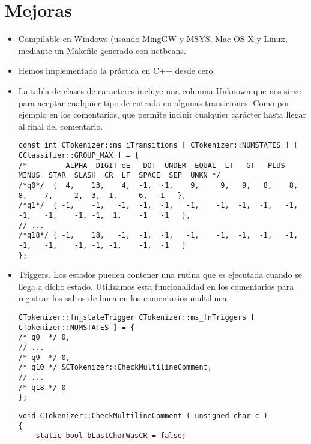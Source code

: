 
\chapter{Mejoras}

\begin{itemize}

    \item Compilable en Windows (usando \href{http://www.mingw.org/}{MingGW} y \href{http://www.mingw.org/wiki/MSYS}{MSYS}, Mac OS X y Linux, mediante un Makefile generado con netbeans.

    \item Hemos implementado la práctica en C++ desde cero.
    
    \item La tabla de clases de caracteres incluye una columna Unknown que nos sirve para aceptar cualquier tipo de entrada en algunas transiciones. Como por ejemplo en los comentarios, que permite incluir cualquier carácter hasta llegar al final del comentario.

        \begin{lstlisting}[caption={Estructura usada para definir los transiciones},basicstyle=\tiny] 
const int CTokenizer::ms_iTransitions [ CTokenizer::NUMSTATES ] [ CClassifier::GROUP_MAX ] = {
/*         ALPHA  DIGIT eE   DOT  UNDER  EQUAL  LT   GT   PLUS  MINUS  STAR  SLASH  CR  LF  SPACE  SEP  UNKN */
/*q0*/  {  4,    13,    4,  -1,  -1,    9,     9,   9,   8,    8,     8,    7,     2,  3,  1,     6,  -1   },
/*q1*/  { -1,    -1,   -1,  -1,  -1,   -1,    -1,  -1,  -1,   -1,    -1,   -1,    -1, -1,  1,    -1   -1   },
// ...
/*q18*/ { -1,    18,   -1,  -1,  -1,   -1,    -1,  -1,  -1,   -1,    -1,   -1,    -1, -1, -1,    -1,  -1   }
};
        \end{lstlisting}

    \item Triggers. Los estados pueden contener una rutina que es ejecutada cuando se llega a dicho estado. Utilizamos esta funcionalidad en los comentarios para registrar los saltos de linea en los comentarios multilinea.
    
        \begin{lstlisting}[caption={Estructura usada para definir los transiciones}]
CTokenizer::fn_stateTrigger CTokenizer::ms_fnTriggers [ CTokenizer::NUMSTATES ] = {
/* q0  */ 0,
// ...
/* q9  */ 0,
/* q10 */ &CTokenizer::CheckMultilineComment,
// ...
/* q18 */ 0
};
        \end{lstlisting}

        \begin{lstlisting}[caption={Trigger para contar lineas en un comentario multilinea}]
void CTokenizer::CheckMultilineComment ( unsigned char c )
{
    static bool bLastCharWasCR = false;


\end{lstlisting}
\end{itemize}
